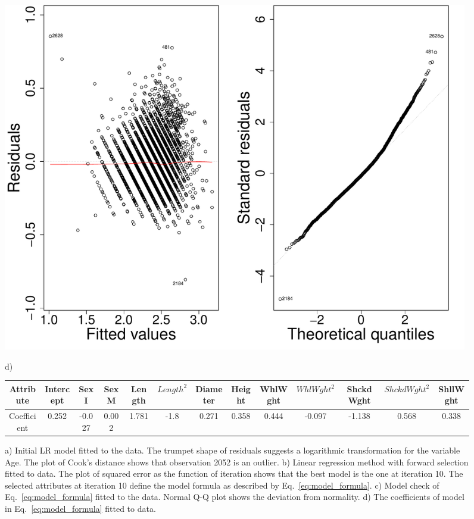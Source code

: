 \documentclass[10pt, paper=a4]{article}
\begin{document}
\begin{figure}[h]
\begin{minipage}{0.3\textwidth}
    \includegraphics[width = 0.99\textwidth]{finalmodelcheck.pdf}
  \end{minipage} \vfill
  \begin{minipage}{0.99\textwidth}
    d)\\
    \begin{center}
      \scriptsize
      \begin{tabular}{c|c|c|c|c|c|c|c|c|c|c|c|c}
      \toprule
      Attribute & Intercept & SexI & SexM & Length & $Length^2$ & Diameter & Height &
      WhlWght & $WhlWght^2$ & ShckdWght & $ShckdWght^2$ & ShllWght \\
      \midrule
      Coefficient & 0.252 & -0.027 & 0.002 & 1.781 & -1.8 & 0.271 & 0.358 &
      0.444 & -0.097 & -1.138 & 0.568 & 0.338\\
      \bottomrule
    \end{tabular}
    \end{center}
  \end{minipage}
  \caption{a) Initial LR model fitted to the data.  The trumpet shape
    of residuals suggests a logarithmic transformation for the
    variable Age.  The plot of Cook's distance shows that observation
    2052 is an outlier.  b) Linear regression method with forward
    selection fitted to data. The plot of squared error as the
    function of iteration shows that the best model is the one at
    iteration 10. The selected attributes at iteration 10 define the
    model formula as described by Eq.~\ref{eq:model_formula}.  c)
    Model check of Eq.~\ref{eq:model_formula} fitted to the data.
    Normal Q-Q plot shows the deviation from normality.  d) The
    coefficients of model in Eq.~\ref{eq:model_formula} fitted to
    data.}
  \label{fig:modelcheck}
\end{figure}
\end{document}
